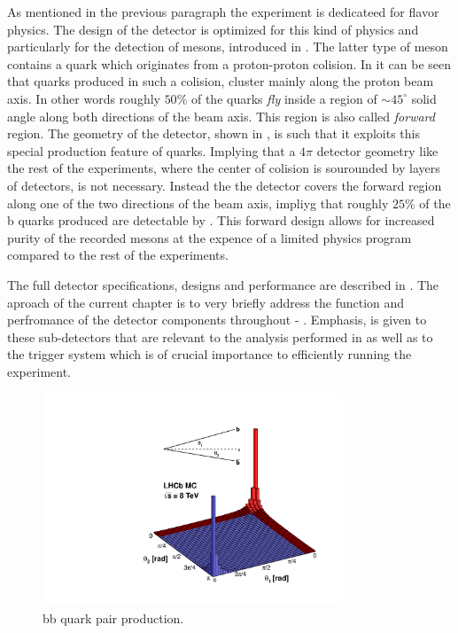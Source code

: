 As mentioned in the previous paragraph the \lhcb experiment is dedicateed for flavor physics.
The design of the detector is optimized for this kind of physics and particularly for the detection
of \B mesons, introduced in . The latter type of meson contains a \bquark quark
which originates from a proton-proton colision. In  it can be seen
that \bquark quarks produced in such a colision, cluster mainly along the proton beam axis. In other words
roughly $50\%$ of the \bquark quarks {\it fly} inside a region of $\sim 45^\circ$ solid angle along both
directions of the beam axis. This region is also called {\it forward} region. The geometry of the \lhcb detector,
shown in , is such that it exploits this special production feature of \bquark quarks. Implying that
a $4\pi$ detector geometry like the rest of the \lhc experiments, where the center of colision is sourounded
by layers of detectors, is not necessary. Instead the the \lhcb detector covers the forward region along one
of the two directions of the beam axis, impliyg that roughly $25\%$ of the b quarks produced are detectable
by \lhcb. This forward design allows for increased purity of the recorded \B mesons at the expence of a limited
physics program compared to the rest of the \lhcb experiments.

The full \lhcb detector specifications, designs and performance are described in \cite{Aaij:2014jba}.
The aproach of the current chapter is to very briefly address the function and perfromance of the detector components
throughout  - . Emphasis, is given to these sub-detectors that are relevant
to the analysis performed in  as well as to the trigger system which is of crucial importance
to efficiently running the \lhcb experiment.

\begin{figure}[t]
  \centering
  \includegraphics[width=0.8\textwidth, trim=0cm 0cm 0cm 2.5cm, clip=true]{Figures/Chapter2/08_rad_acc_scheme_right}
  \caption{bb quark pair production.}
  \label{bb_roduction_angles}
\end{figure}
